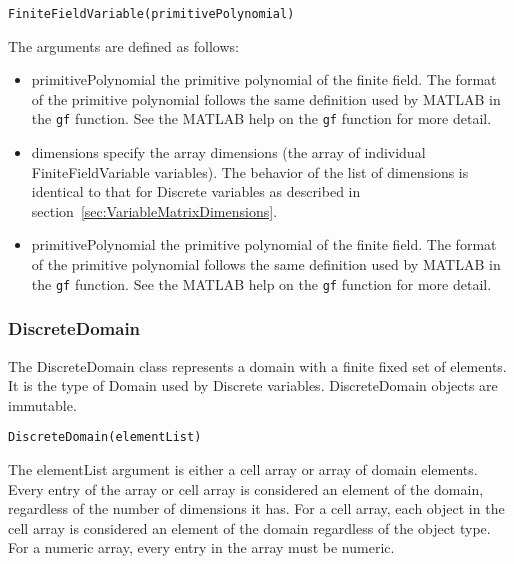 \ifjava
\begin{lstlisting}
FiniteFieldVariable(primitivePolynomial)
\end{lstlisting}
\fi

The arguments are defined as follows:

\ifmatlab
\begin{itemize}
\item primitivePolynomial the primitive polynomial of the finite field.  The format of the primitive polynomial follows the same definition used by MATLAB in the \texttt{gf} function.  See the MATLAB help on the \texttt{gf} function for more detail.
\item dimensions specify the array dimensions (the array of individual FiniteFieldVariable variables).  The behavior of the list of dimensions is identical to that for Discrete variables as described in section~\ref{sec:VariableMatrixDimensions}.
\end{itemize}
\fi

\ifjava
\begin{itemize}
\item primitivePolynomial the primitive polynomial of the finite field.  The format of the primitive polynomial follows the same definition used by MATLAB in the \texttt{gf} function.  See the MATLAB help on the \texttt{gf} function for more detail.
\end{itemize}
\fi

\subsubsection{DiscreteDomain}
\label{sec:DiscreteDomain}

The DiscreteDomain class represents a domain with a finite fixed set of elements. It is the type of Domain used
by Discrete variables. DiscreteDomain objects are immutable.



\ifmatlab
\begin{lstlisting}
DiscreteDomain(elementList)
\end{lstlisting}

The elementList argument is either a cell array or array of domain elements.  Every entry of the array or cell array is considered an element of the domain, regardless of the number of dimensions it has.  For a cell array, each object in the cell array is considered an element of the domain regardless of the object type.  For a numeric array, every entry in the array must be numeric.
\fi

